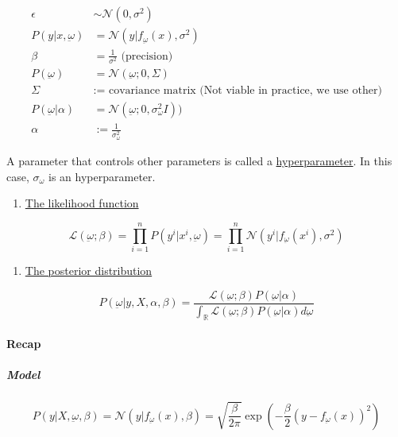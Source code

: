 \begin{align*}
	\epsilon                      & \sim \mathcal{N}(0, \sigma^2)                                       \\
	P(y | x, \underbar{\omega})   & = \mathcal{N}(y | f_{\underbar{\omega}}(x), \sigma^2)               \\
	\beta                         & = \frac{1}{\sigma^2} \text{ (precision)}                            \\
	P(\underbar{\omega})          & = \mathcal{N}(\underbar{\omega} ; 0 , \Sigma)                       \\
	\Sigma                        & := \text{ covariance matrix (Not viable in practice, we use other)} \\
	P(\underbar{\omega} | \alpha) & = \mathcal{N}(\underbar{\omega} ; 0 , \sigma_{\omega}^2 I))         \\
	\alpha                        & := \frac{1}{\sigma_{\omega}^2}
\end{align*}

A parameter that controls other parameters is called a
\uline{hyperparameter}. In this case, \(\sigma_\omega\) is an
hyperparameter.

\begin{enumerate}
	\item
	      \uline{The likelihood function}
\end{enumerate}

\[
	\mathcal{L}(\underbar{\omega} ; \beta) = \prod_{i=1}^n P(y^i | x^i, \underbar{\omega}) =
	\prod_{i=1}^n \mathcal{N}(y^i | f_{\underbar{\omega}}(x^i), \sigma^2)
\]

\begin{enumerate}
	\item
	      \uline{The posterior distribution}
\end{enumerate}

\[P(\underbar{\omega} | y, X, \alpha, \beta) = \frac{\mathcal{L}(\underbar{\omega}; \beta) P(\underbar{\omega} | \alpha)}
	{\int_{\mathds{R}} \mathcal{L}(\underbar{\omega}; \beta) P(\underbar{\omega} | \alpha) d\underbar{\omega}}
\]

\paragraph{Recap}

\subparagraph{Model}

\[
	P(y |  X, \underbar{\omega}, \beta) = \mathcal{N}(y | f_{\underbar{\omega}}(x), \beta) =
	\sqrt{\frac{\beta}{2\pi}} \exp \left( -\frac{\beta}{2} (y - f_{\underbar{\omega}}(x))^2 \right)
\]

